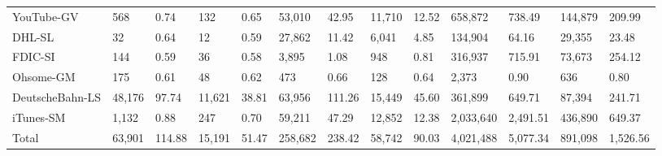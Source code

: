 \begin{tabular}{lllllllllllll}
YouTube-GV & 568 & 0.74 & 132 & 0.65 & 53,010 & 42.95 & 11,710 & 12.52 & 658,872 & 738.49 & 144,879 & 209.99 \\
DHL-SL & 32 & 0.64 & 12 & 0.59 & 27,862 & 11.42 & 6,041 & 4.85 & 134,904 & 64.16 & 29,355 & 23.48 \\
FDIC-SI & 144 & 0.59 & 36 & 0.58 & 3,895 & 1.08 & 948 & 0.81 & 316,937 & 715.91 & 73,673 & 254.12 \\
Ohsome-GM & 175 & 0.61 & 48 & 0.62 & 473 & 0.66 & 128 & 0.64 & 2,373 & 0.90 & 636 & 0.80 \\
DeutscheBahn-LS & 48,176 & 97.74 & 11,621 & 38.81 & 63,956 & 111.26 & 15,449 & 45.60 & 361,899 & 649.71 & 87,394 & 241.71 \\
iTunes-SM & 1,132 & 0.88 & 247 & 0.70 & 59,211 & 47.29 & 12,852 & 12.38 & 2,033,640 & 2,491.51 & 436,890 & 649.37 \\
Total & 63,901 & 114.88 & 15,191 & 51.47 & 258,682 & 238.42 & 58,742 & 90.03 & 4,021,488 & 5,077.34 & 891,098 & 1,526.56 \\
\bottomrule
\end{tabular}
